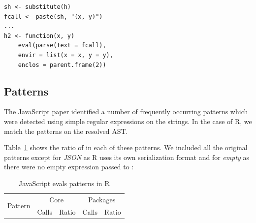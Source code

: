\documentclass[conference]{IEEEtran}
\begin{document}
\begin{lstlisting}
sh <- substitute(h)
fcall <- paste(sh, "(x, y)")
...
h2 <- function(x, y)
    eval(parse(text = fcall),
    envir = list(x = x, y = y),
    enclos = parent.frame(2))
\end{lstlisting}

\subsection{Patterns}

The JavaScript paper identified a number of frequently occurring \eval
patterns which were detected using simple regular expressions on the \eval
strings. In the case of R, we match the patterns on the resolved AST.

Table~\ref{table:js-pattens-in-r} shows the ratio of \eval in each of these
patterns. We included all the original patterns except for \emph{JSON} as R uses
its own serialization format and for \emph{empty} as there were no empty expression
passed to \eval:

\begin{table}[ht]%
  \centering
\begin{tabular}{r|r|r|r|r}\hline
\multirow{2}{*}{Pattern} & \multicolumn{2}{c|}{Core} & \multicolumn{2}{c}{Packages} \\
                         & Calls & Ratio            & Calls & Ratio \\\hline

\end{tabular}
\caption{JavaScript evals patterns in R}
\label{table:js-pattens-in-r}
\end{table}
\end{document}
